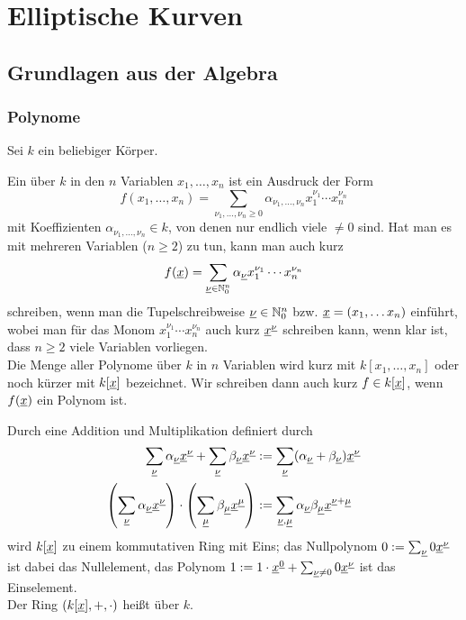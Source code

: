 \section{Elliptische Kurven}
\label{sec:para2}
\nextlecture
\subsection{Grundlagen aus der Algebra}
\subsubsection{Polynome}
	Sei $k$ ein beliebiger Körper. \marginnote{[7]}
	
\begin{defn}[Polynom]
	Ein  über $k$ in den $n$ Variablen $x_1,\dots,x_n$ ist ein Ausdruck der Form
	\[ f(x_1,\dots,x_n) = \sum\limits_{\nu_1,\dots,\nu_n \geq 0} \alpha_{\nu_1, \dots, \nu_n} x_1^{\nu_1} \cdots x_n^{\nu_n} \]
	mit Koeffizienten $\alpha_{\nu_1,\dots,\nu_n} \in k$, von denen nur endlich viele $\neq 0$ sind. Hat man es mit mehreren Variablen ($n \geq 2$) zu tun, kann man auch kurz
	\[ f(\underline{x}) = \sum_{\uline{\nu} \in \NN_0^n} \alpha_{\uline{\nu}} x_1^{\nu_1} \cdots x_n^{\nu_n} \]
	schreiben, wenn man die Tupelschreibweise $\uline{\nu} \in \NN_0^n$ bzw. $\uline{x} = (x_1, \dots x_n)$ einführt, wobei man für das Monom $x_1^{\nu_1} \cdots x_n^{\nu_n}$ auch kurz $\uline{x}^{\uline{\nu}}$ schreiben kann, wenn klar ist, dass $n \geq 2$ viele Variablen vorliegen. \\
	Die Menge aller Polynome über $k$ in $n$ Variablen wird kurz mit $k[x_1,\dots,x_n]$ oder noch kürzer mit $k[\uline{x}]$ bezeichnet. Wir schreiben dann auch kurz $f \in k[\uline{x}]$, wenn $f(\uline{x})$ ein Polynom ist.
\end{defn}

\begin{bem}
	Durch eine Addition und Multiplikation definiert durch
	\begin{equation}
	\begin{aligned}
		\sum_{\uline{\nu}} \alpha_{\uline{\nu}} \uline{x}^{\uline{\nu}} + \sum_{\uline{\nu}} \beta_{\uline{\nu}} \uline{x}^{\uline{\nu}} &:= \sum_{\uline{\nu}} (\alpha_{\uline{\nu}} + \beta_{\uline{\nu}}) \uline{x}^{\uline{\nu}} \\
		\enbrace*{\sum_{\uline{\nu}} \alpha_{\uline{\nu}} \uline{x}^{\uline{\nu}}} \cdot \enbrace*{\sum_{\uline{\mu}} \beta_{\uline{\mu}} \uline{x}^{\uline{\mu}}} &:= \sum_{\uline{\nu},\uline{\mu}} \alpha_{\uline{\nu}} \beta_{\uline{\mu}} \uline{x}^{\uline{\nu} + \uline{\mu}}
	\end{aligned}
	\end{equation}
	wird $k[\uline{x}]$ zu einem kommutativen Ring mit Eins; das Nullpolynom $0 := \sum_{\uline{\nu}} 0 \uline{x}^{\uline{\nu}}$ ist dabei das Nullelement, das Polynom $1 := 1 \cdot \uline{x}^{\uline{0}} + \sum_{\uline{\nu} \neq 0} 0 \uline{x}^{\uline{\nu}}$ ist das Einselement.  \\
	Der Ring $(k[\uline{x}],+,\cdot)$ heißt  über $k$.
\end{bem}

